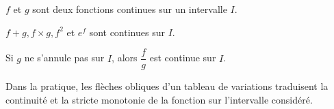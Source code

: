 \begin{bprops}
	
\(f\) et \(g\) sont deux fonctions continues sur un intervalle \(I\).

\begin{itemProp}
	\item \(f+g, f \times g, f^{2}\) et \(e^{f}\) sont continues sur \(I\).
	\item Si \(g\) ne s'annule pas sur \(I\), alors \(\dfrac{f}{g}\) est continue sur \(I\).
\end{itemProp}

\end{bprops}

\begin{brmq}
Dans la pratique, les flèches obliques d'un tableau de variations traduisent la continuité et la stricte monotonie de la fonction sur l'intervalle considéré.
\end{brmq}

